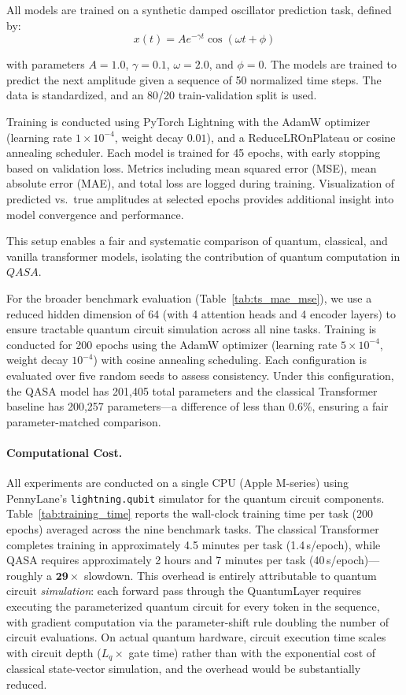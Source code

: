 \documentclass[conference]{IEEEtran}
\begin{document}
All models are trained on a synthetic damped oscillator prediction task, defined by:
\begin{equation}
    x(t) = A e^{-\gamma t} \cos(\omega t + \phi)
\end{equation}

with parameters $A = 1.0$, $\gamma = 0.1$, $\omega = 2.0$, and $\phi = 0$. The models are trained to predict the next amplitude given a sequence of 50 normalized time steps. The data is standardized, and an 80/20 train-validation split is used.

Training is conducted using PyTorch Lightning with the AdamW optimizer (learning rate $1 \times 10^{-4}$, weight decay $0.01$), and a ReduceLROnPlateau or cosine annealing scheduler. Each model is trained for 45 epochs, with early stopping based on validation loss. Metrics including mean squared error (MSE), mean absolute error (MAE), and total loss are logged during training. Visualization of predicted vs.\ true amplitudes at selected epochs provides additional insight into model convergence and performance.

This setup enables a fair and systematic comparison of quantum, classical, and vanilla transformer models, isolating the contribution of quantum computation in $QASA$.

For the broader benchmark evaluation (Table~\ref{tab:ts_mae_mse}), we use a reduced hidden dimension of 64 (with 4 attention heads and 4 encoder layers) to ensure tractable quantum circuit simulation across all nine tasks. Training is conducted for 200 epochs using the AdamW optimizer (learning rate $5 \times 10^{-4}$, weight decay $10^{-4}$) with cosine annealing scheduling. Each configuration is evaluated over five random seeds to assess consistency. Under this configuration, the QASA model has 201,405 total parameters and the classical Transformer baseline has 200,257 parameters---a difference of less than 0.6\%, ensuring a fair parameter-matched comparison.

\paragraph{Computational Cost.}
All experiments are conducted on a single CPU (Apple M-series) using PennyLane's \texttt{lightning.qubit} simulator for the quantum circuit components. Table~\ref{tab:training_time} reports the wall-clock training time per task (200 epochs) averaged across the nine benchmark tasks. The classical Transformer completes training in approximately 4.5 minutes per task (1.4\,s/epoch), while QASA requires approximately 2 hours and 7 minutes per task (40\,s/epoch)---roughly a $\mathbf{29\times}$ slowdown. This overhead is entirely attributable to quantum circuit \textit{simulation}: each forward pass through the QuantumLayer requires executing the parameterized quantum circuit for every token in the sequence, with gradient computation via the parameter-shift rule doubling the number of circuit evaluations. On actual quantum hardware, circuit execution time scales with circuit depth ($L_q \times$ gate time) rather than with the exponential cost of classical state-vector simulation, and the overhead would be substantially reduced.
\end{document}
